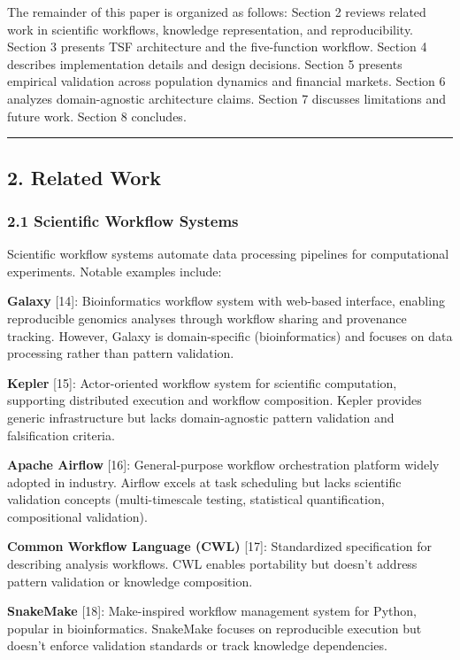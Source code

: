 \documentclass[
]{article}
\begin{document}
The remainder of this paper is organized as follows: Section 2 reviews
related work in scientific workflows, knowledge representation, and
reproducibility. Section 3 presents TSF architecture and the
five-function workflow. Section 4 describes implementation details and
design decisions. Section 5 presents empirical validation across
population dynamics and financial markets. Section 6 analyzes
domain-agnostic architecture claims. Section 7 discusses limitations and
future work. Section 8 concludes.

\begin{center}\rule{0.5\linewidth}{0.5pt}\end{center}

\subsection{2. Related Work}\label{related-work}

\subsubsection{2.1 Scientific Workflow
Systems}\label{scientific-workflow-systems}

Scientific workflow systems automate data processing pipelines for
computational experiments. Notable examples include:

\textbf{Galaxy} {[}14{]}: Bioinformatics workflow system with web-based
interface, enabling reproducible genomics analyses through workflow
sharing and provenance tracking. However, Galaxy is domain-specific
(bioinformatics) and focuses on data processing rather than pattern
validation.

\textbf{Kepler} {[}15{]}: Actor-oriented workflow system for scientific
computation, supporting distributed execution and workflow composition.
Kepler provides generic infrastructure but lacks domain-agnostic pattern
validation and falsification criteria.

\textbf{Apache Airflow} {[}16{]}: General-purpose workflow orchestration
platform widely adopted in industry. Airflow excels at task scheduling
but lacks scientific validation concepts (multi-timescale testing,
statistical quantification, compositional validation).

\textbf{Common Workflow Language (CWL)} {[}17{]}: Standardized
specification for describing analysis workflows. CWL enables portability
but doesn't address pattern validation or knowledge composition.

\textbf{SnakeMake} {[}18{]}: Make-inspired workflow management system
for Python, popular in bioinformatics. SnakeMake focuses on reproducible
execution but doesn't enforce validation standards or track knowledge
dependencies.
\end{document}
